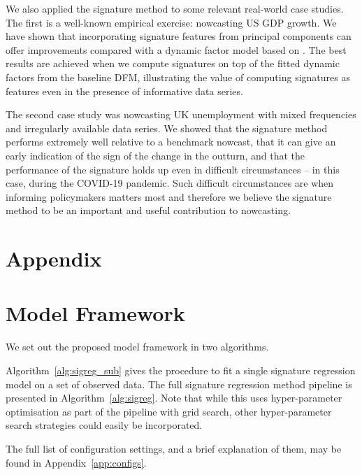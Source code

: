 \documentclass[a4paper, 12pt]{article}
\theoremstyle{remark}
\begin{document}
We also applied the signature method to some relevant real-world case studies. The first is a well-known empirical exercise: nowcasting US GDP growth. We have shown that incorporating signature features from principal components can offer improvements compared with a dynamic factor model based on \cite{bok2018macroeconomic}. The best results are achieved when we compute signatures on top of the fitted dynamic factors from the baseline DFM, illustrating the value of computing signatures as features even in the presence of informative data series.

The second case study was nowcasting UK unemployment with mixed frequencies and irregularly available data series. We showed that the signature method performs extremely well relative to a benchmark nowcast, that it can give an early indication of the sign of the change in the outturn, and that the performance of the signature holds up even in difficult circumstances -- in this case, during the COVID-19 pandemic. Such difficult circumstances are when informing policymakers matters most and therefore we believe the signature method to be an important and useful contribution to nowcasting.

\clearpage

\newpage
\singlespacing
 


\newpage
\appendix
\section*{Appendix}
\section{Model Framework}\label{sec:framework}

We set out the proposed model framework in two algorithms.

Algorithm~\ref{alg:sigreg_sub} gives the procedure to fit a single signature regression model on a set of observed data. The full signature regression method pipeline is presented in Algorithm~\ref{alg:sigreg}. Note that while this uses hyper-parameter optimisation as part of the pipeline with grid search, other hyper-parameter search strategies could easily be incorporated.

The full list of configuration settings, and a brief explanation of them, may be found in Appendix~\ref{app:configs}.
\end{document}
